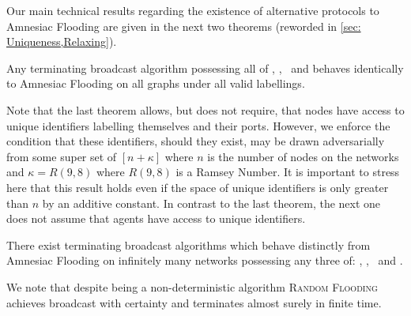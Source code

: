 Our main technical results regarding the existence of alternative protocols to Amnesiac Flooding are given in the next two theorems (reworded in \cref{sec: Uniqueness,Relaxing}).

\begin{*theorem}
    Any terminating broadcast algorithm possessing all of \StrictStatelessness, \Obliviousness, \Determinism\ and \Bandwidth{} behaves identically to Amnesiac Flooding on all graphs under all valid labellings.
\end{*theorem}
Note that the last theorem allows, but does not require, that nodes have access to unique identifiers labelling themselves and their ports. 
However, we enforce the condition that these identifiers, should they exist, may be drawn adversarially from some super set of $[n+\kappa]$ where $n$ is the number of nodes on the networks and $\kappa=R(9,8)$ where $R(9,8)$ is a Ramsey Number.
It is important to stress here that this result holds even if the space of unique identifiers is only greater than $n$ by an additive constant.
In contrast to the last theorem, the next one does not assume that agents have access to unique identifiers.
\begin{*theorem}
    There exist terminating broadcast algorithms which behave distinctly from Amnesiac Flooding on infinitely many networks possessing any three of: \anew{\StrictStatelessness}, \Obliviousness, \Determinism\ and \Bandwidth.
\end{*theorem}

We note that despite being a non-deterministic algorithm \textsc{Random Flooding} achieves broadcast with certainty and terminates almost surely in finite time.\\

